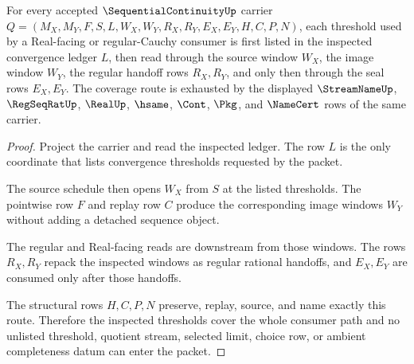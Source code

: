 \begin{theorem}
\label{thm:sequential-continuity-inspected-threshold-coverage}
For every accepted $\SequentialContinuityUp$ carrier $Q=(M_X,M_Y,F,S,L,W_X,W_Y,R_X,R_Y,E_X,E_Y,H,C,P,N)$, each threshold used by a Real-facing or regular-Cauchy consumer is first listed in the inspected convergence ledger $L$, then read through the source window $W_X$, the image window $W_Y$, the regular handoff rows $R_X,R_Y$, and only then through the seal rows $E_X,E_Y$. The coverage route is exhausted by the displayed $\StreamNameUp$, $\RegSeqRatUp$, $\RealUp$, $\hsame$, $\Cont$, $\Pkg$, and $\NameCert$ rows of the same carrier.
\end{theorem}
\begin{proof}
Project the carrier and read the inspected ledger. The row $L$ is the only coordinate that lists convergence thresholds requested by the packet.

The source schedule then opens $W_X$ from $S$ at the listed thresholds. The pointwise row $F$ and replay row $C$ produce the corresponding image windows $W_Y$ without adding a detached sequence object.

The regular and Real-facing reads are downstream from those windows. The rows $R_X,R_Y$ repack the inspected windows as regular rational handoffs, and $E_X,E_Y$ are consumed only after those handoffs.

The structural rows $H,C,P,N$ preserve, replay, source, and name exactly this route. Therefore the inspected thresholds cover the whole consumer path and no unlisted threshold, quotient stream, selected limit, choice row, or ambient completeness datum can enter the packet.
\end{proof}


